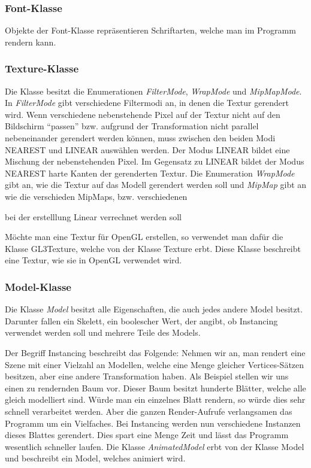 \subsubsection{Font-Klasse}
\label{Fontclass}
Objekte der Font-Klasse repräsentieren Schriftarten, welche man im Programm rendern kann.

\subsubsection{Texture-Klasse}
\label{Textureclass}
Die Klasse besitzt die Enumerationen \textit{FilterMode}, \textit{WrapMode} und \textit{MipMapMode}. In \textit{FilterMode} gibt verschiedene Filtermodi an, in denen die Textur gerendert wird.
Wenn verschiedene nebenstehende Pixel auf der Textur nicht auf den Bildschirm "`passen"' bzw. aufgrund der Transformation nicht parallel nebeneinander gerendert werden können, muss zwischen den beiden Modi NEAREST und LINEAR auswählen werden. Der Modus LINEAR bildet eine Mischung der nebenstehenden Pixel. 
Im Gegensatz zu LINEAR bildet der Modus NEAREST harte Kanten der gerenderten Textur.
Die Enumeration \textit{WrapMode} gibt an, wie die Textur auf das Modell gerendert werden soll und \textit{MipMap} gibt an wie die verschieden MipMaps, bzw. verschiedenen 

bei der erstelllung 
Linear verrechnet werden soll 

Möchte man eine Textur für OpenGL erstellen, so verwendet man dafür die Klasse GL3Texture, welche von der Klasse Texture erbt. Diese Klasse beschreibt eine Textur, wie sie in OpenGL verwendet wird.

\subsubsection{Model-Klasse}
\label{Modelclass}
Die Klasse \textit{Model} besitzt alle Eigenschaften, die auch jedes andere Model besitzt. Darunter fallen ein Skelett, ein boolescher Wert, der angibt, ob Instancing verwendet werden soll und mehrere Teile des Models.

Der Begriff Instancing beschreibt das Folgende:
Nehmen wir an, man rendert eine Szene mit einer Vielzahl an Modellen, welche eine Menge gleicher Vertices-Sätzen  besitzen, aber eine andere Transformation haben.
Als Beispiel stellen wir uns einen zu rendernden Baum vor.
Dieser Baum besitzt hunderte Blätter, welche alle gleich modelliert sind. Würde man ein einzelnes Blatt rendern, so würde dies sehr schnell verarbeitet werden. Aber die ganzen Render-Aufrufe verlangsamen das Programm um ein Vielfaches. 
Bei Instancing werden nun verschiedene Instanzen dieses Blattes gerendert. Dies spart eine Menge Zeit und lässt das Programm wesentlich schneller laufen.
Die Klasse \textit{AnimatedModel} erbt von der Klasse Model und beschreibt ein Model, welches animiert wird.

